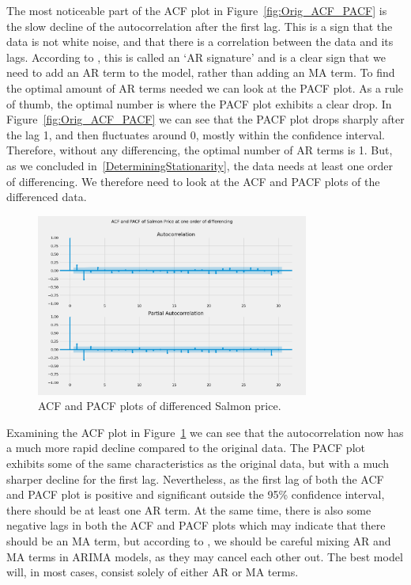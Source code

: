 The most noticeable part of the ACF plot in Figure~\ref{fig:Orig_ACF_PACF} is the slow decline of the autocorrelation after the first lag. This is a sign that the data is not white noise, and that there is a correlation between the data and its lags. According to \textcite{nau_2019}, this is called an `AR signature' and is a clear sign that we need to add an AR term to the model, rather than adding an MA term. To find the optimal amount of AR terms needed we can look at the PACF plot. As a rule of thumb, the optimal number is where the PACF plot exhibits a clear drop. In Figure~\ref{fig:Orig_ACF_PACF} we can see that the PACF plot drops sharply after the lag 1, and then fluctuates around 0, mostly within the confidence interval. Therefore, without any differencing, the optimal number of AR terms is 1. But, as we concluded in~\ref{DeterminingStationarity}, the data needs at least one order of differencing. We therefore need to look at the ACF and PACF plots of the differenced data.
\begin{figure}[H]
    \centering
    \includegraphics[width=0.8\textwidth]{data/Figures/ARIMA/DiffACF-PACF_30.png}
    \caption[ACF and PACF plots of differenced Salmon price]{ACF and PACF plots of differenced Salmon price.}\label{fig:Diff1_ACF_PACF}
\end{figure}

Examining the ACF plot in Figure~\ref{fig:Diff1_ACF_PACF} we can see that the autocorrelation now has a much more rapid decline compared to the original data. The PACF plot exhibits some of the same characteristics as the original data, but with a much sharper decline for the first lag. Nevertheless, as the first lag of both the ACF and PACF plot is positive and significant outside the 95\% confidence interval, there should be at least one AR term. At the same time, there is also some negative lags in both the ACF and PACF plots which may indicate that there should be an MA term, but according to \textcite{nau_2019}, we should be careful mixing AR and MA terms in ARIMA models, as they may cancel each other out. The best model will, in most cases, consist solely of either AR or MA terms.

